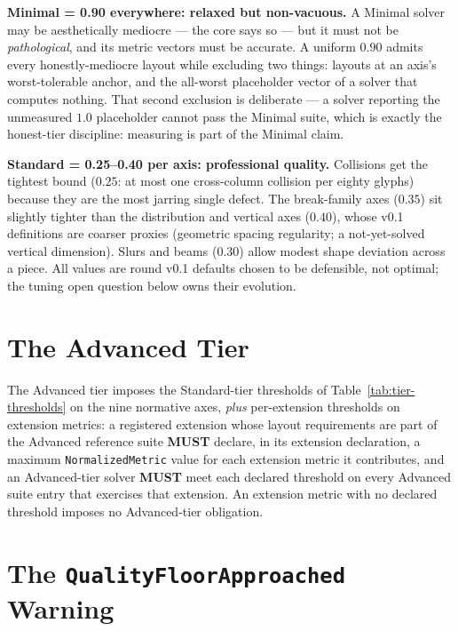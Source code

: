 \documentclass[11pt,letterpaper]{report}
\newcounter{requirement}[chapter]
\newcommand{\MUST}{\textbf{MUST}}
\begin{document}
\begin{rationale}
\textbf{Minimal = 0.90 everywhere: relaxed but non-vacuous.} A Minimal
solver may be aesthetically mediocre --- the core says so --- but it must
not be \emph{pathological}, and its metric vectors must be accurate. A
uniform $0.90$ admits every honestly-mediocre layout while excluding two
things: layouts at an axis's worst-tolerable anchor, and the all-worst
placeholder vector of a solver that computes nothing. That second
exclusion is deliberate --- a solver reporting the unmeasured $1.0$
placeholder cannot pass the Minimal suite, which is exactly the
honest-tier discipline: measuring is part of the Minimal claim.

\textbf{Standard = 0.25--0.40 per axis: professional quality.} Collisions
get the tightest bound ($0.25$: at most one cross-column collision per
eighty glyphs) because they are the most jarring single defect. The
break-family axes ($0.35$) sit slightly tighter than the distribution and
vertical axes ($0.40$), whose v0.1 definitions are coarser proxies
(geometric spacing regularity; a not-yet-solved vertical dimension). Slurs
and beams ($0.30$) allow modest shape deviation across a piece. All values
are round v0.1 defaults chosen to be defensible, not optimal; the tuning
open question below owns their evolution.
\end{rationale}

\section{The Advanced Tier}
\label{sec:thresholds:advanced}

\begin{requirement}
\label{req:qmc:advanced}
The Advanced tier imposes the Standard-tier thresholds of
Table~\ref{tab:tier-thresholds} on the nine normative axes, \emph{plus}
per-extension thresholds on extension metrics: a registered extension
whose layout requirements are part of the Advanced reference suite
\MUST{} declare, in its extension declaration, a maximum
\texttt{NormalizedMetric} value for each extension metric it contributes,
and an Advanced-tier solver \MUST{} meet each declared threshold on every
Advanced suite entry that exercises that extension. An extension metric
with no declared threshold imposes no Advanced-tier obligation.
\end{requirement}

\section{The \texttt{QualityFloorApproached} Warning}
\label{sec:thresholds:floor}
\end{document}
